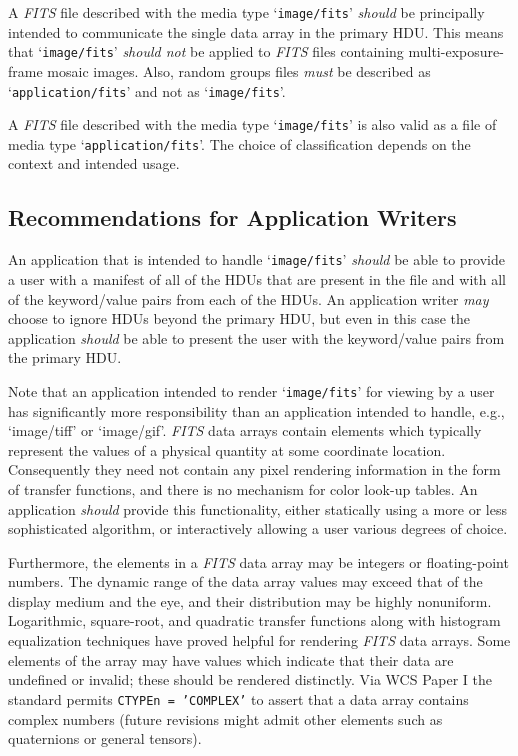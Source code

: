 \documentclass[11pt,makeidx]{book}     %
\begin{document}
  A {\em FITS\/} file described with the media type `{\tt image/fits}' {\em should} be
  principally intended to communicate the single data array in the
  primary HDU.  This means that `{\tt image/fits}' {\em should not} be applied to {\em FITS\/}   
  files containing multi-exposure-frame mosaic images.  Also,
  random groups files {\em must} be described as `{\tt application/fits}' and not
  as `{\tt image/fits}'.


  A {\em FITS\/} file described with the media type `{\tt image/fits}' is also valid
  as a file of media type `{\tt application/fits}'.  The choice of
  classification depends on the context and intended usage.

\subsection{Recommendations for Application Writers}

  An application that is intended to handle `{\tt image/fits}' {\em should} be able
  to provide a user with a manifest of all of the HDUs that are present
  in the file and with all of the keyword/value pairs from each of the
  HDUs.  An application writer {\em may} choose to ignore HDUs beyond the
  primary HDU, but even in this case the application {\em should} be able to present
  the user with the keyword/value pairs from the primary HDU.

  Note that an application intended to render `{\tt image/fits}' for viewing
  by a user has significantly more responsibility than an application
  intended to handle, e.g., `image/tiff' or `image/gif'.  {\em FITS\/} data
  arrays contain elements which typically represent the values of a
  physical quantity at some coordinate location.  Consequently they
  need not contain any pixel rendering information in the form of
  transfer functions, and there is no mechanism for color look-up
  tables.  An application {\em should} provide this functionality, either
  statically using a more or less sophisticated algorithm, or
  interactively allowing a user various degrees of choice.

  Furthermore, the elements in a {\em FITS\/} data array may be integers or
  floating-point numbers.  The dynamic range of the data array values
  may exceed that of the display medium and the eye, and their
  distribution may be highly nonuniform.  Logarithmic, square-root, and
  quadratic transfer functions along with histogram equalization
  techniques have proved helpful for rendering {\em FITS\/} data arrays.  Some
  elements of the array may have values which indicate that their data
  are undefined or invalid; these should be rendered distinctly.  Via
  WCS Paper I \cite{greisen02} the standard permits {\tt CTYPEn = 'COMPLEX'} to
  assert that a data array contains complex numbers (future revisions
  might admit other elements such as quaternions or general tensors).
\end{document}

